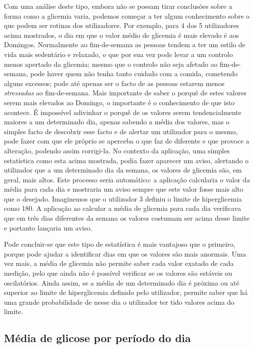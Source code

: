 Com uma análise deste tipo, embora não se possam tirar conclusões sobre a forma como a glicemia varia, podemos começar a ter algum conhecimento sobre o que podem ser rotinas dos utilizadores. Por exemplo, para 4 dos 5 utilizadores acima mostrados, o dia em que o valor médio de glicemia é mais elevado é aos Domingos. Normalmente ao fim-de-semana as pessoas tendem a ter um estilo de vida mais sedentário e relaxado, o que por sua vez pode levar a um controlo menos apertado da glicemia; mesmo que o controlo não seja afetado ao fim-de-semana, pode haver quem não tenha tanto cuidado com a comida, cometendo alguns excessos; pode até apenas ser o facto de as pessoas estarem menos \textit{stressadas} ao fim-de-semana. Mais importante de saber o porquê de estes valores serem mais elevados ao Domingo, o importante é o conhecimento de que isto acontece. É impossível adivinhar o porquê de os valores serem tendencialmente maiores a um determinado dia, apenas sabendo a média dos valores, mas o simples facto de descobrir esse facto e de alertar um utilizador para o mesmo, pode fazer com que ele próprio se aperceba o que faz de diferente e que provoce a alteração, podendo assim corrigi-la. 
No contexto da aplicação, uma simples estatística como esta acima mostrada, podia fazer aparecer um aviso, alertando o utilizador que a um determinado dia da semana, os valores de glicemia são, em geral, mais altos. Este processo seria automático: a aplicação calcularia o valor da média para cada dia e mostraria um aviso sempre que este valor fosse mais alto que o desejado. Imaginemos que o utilizador 3 definiu o limite de hiperglicemia como 180. A aplicação ao calcular a média de glicemia para cada dia verificava que em três dias diferentes da semana os valores costumam ser acima desse limite e portanto lançaria um aviso.\newline

Pode concluir-se que este tipo de estatística é mais vantajoso que o primeiro, porque pode ajudar a identificar dias em que os valores são mais anormais. Uma vez mais, a média de glicemia não permite saber cada valor exatado de cada medição, pelo que ainda não é possível verificar se os valores são estáveis ou oscilatórios. Ainda assim, se a média de um determinado dia é próxima ou até superior ao limite de hiperglicemia definido pelo utilizador, permite saber que há uma grande probabilidade de nesse dia o utilizador ter tido valores acima do limite.

\subsection{Média de glicose por período do dia}

